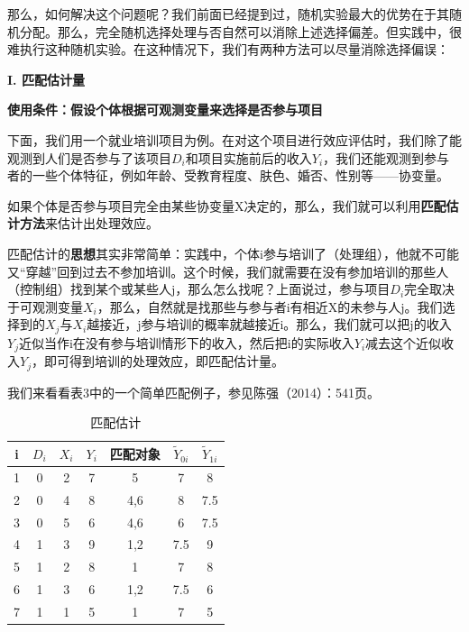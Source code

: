 \documentclass[cn,12pt,math=newtx,citestyle=gb7714-2015,bibstyle=gb7714-2015]{elegantbook}
\begin{document}
	那么，如何解决这个问题呢？我们前面已经提到过，随机实验最大的优势在于其随机分配。那么，完全随机选择处理与否自然可以消除上述选择偏差。但实践中，很难执行这种随机实验。在这种情况下，我们有两种方法可以尽量消除选择偏误：
	
	\textbf{I. 匹配估计量}
	
	\textbf{使用条件：假设个体根据可观测变量来选择是否参与项目}
	
	下面，我们用一个就业培训项目为例。在对这个项目进行效应评估时，我们除了能观测到人们是否参与了该项目$D_i$和项目实施前后的收入$Y_i$，我们还能观测到参与者的一些个体特征，例如年龄、受教育程度、肤色、婚否、性别等——协变量。
	
	如果个体是否参与项目完全由某些协变量X决定的，那么，我们就可以利用\textbf{匹配估计方法}来估计出处理效应。
	
	匹配估计的\textbf{思想}其实非常简单：实践中，个体i参与培训了（处理组），他就不可能又“穿越”回到过去不参加培训。这个时候，我们就需要在没有参加培训的那些人（控制组）找到某个或某些人j，那么怎么找呢？上面说过，参与项目$D_i$完全取决于可观测变量$X_i$，那么，自然就是找那些与参与者i有相近X的未参与人j。我们选择到的$X_j$与$X_i$越接近，j参与培训的概率就越接近i。那么，我们就可以把j的收入$Y_j$近似当作i在没有参与培训情形下的收入，然后把i的实际收入$Y_i$减去这个近似收入$Y_j$，即可得到培训的处理效应，即匹配估计量。
	
	我们来看看表3中的一个简单匹配例子，参见陈强（2014）：541页。
	
	\begin{center}
		\begin{table}[!h]
			\caption{匹配估计}\label{tab:digit}
			\begin{center}
				\begin{tabular}{c|c|c|c|c|c|c}
					\hline
					i&$D_i$&$X_i$&$Y_i$&匹配对象&$\tilde{Y}_{0i}$&$\tilde{Y}_{1i}$\\
					\hline
					1&0&2&7&{5}&7&8\\
					\hline
					2&0&4&8&{4,6}&8&7.5\\
					\hline
					3&0&5&6&{4,6}&6&7.5\\
					\hline
					4&1&3&9&{1,2}&7.5&9\\
					\hline
					5&1&2&8&{1}&7&8\\
					\hline
					6&1&3&6&{1,2}&7.5&6\\
					\hline
					7&1&1&5&{1}&7&5\\
					\hline
				\end{tabular}
			\end{center}
		\end{table}
	\end{center}
	
\end{document}
